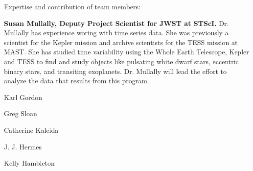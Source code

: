 Expertise and contribution of team members:

\textbf{Susan Mullally, Deputy Project Scientist for JWST at STScI.} Dr. Mullally has experience woring with time series data. She was previously a scientist for the Kepler mission and archive scientists for the TESS mission at MAST.  She has studied time variability using the Whole Earth Telescope, Kepler and TESS to find and study objects like pulsating white dwarf stars, eccentric binary stars, and transiting exoplanets.  Dr. Mullally will lead the effort to analyze the data that results from this program.


Karl Gordon


Greg Sloan


Catherine Kaleida


J. J. Hermes

Kelly Hambleton

